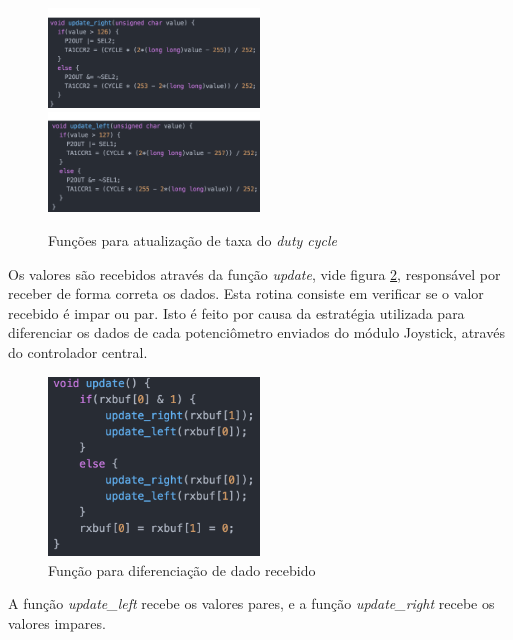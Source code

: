     \begin{figure}[!htb]
    \centering
    \includegraphics[width = 0.5\textwidth]{figuras/resultados/update_motor_right}
    \includegraphics[width = 0.5\textwidth]{figuras/resultados/update_motor_left}
    \caption{Funções para atualização de taxa do \textit{duty cycle}}
    \label{fig:update_motors}
    \end{figure}

    Os valores são recebidos através da função \textit{update}, vide figura \ref{fig:update}, responsável por receber de forma correta os dados. Esta rotina consiste em verificar se o valor recebido é impar ou par. Isto é feito por causa da estratégia utilizada para diferenciar os dados de cada potenciômetro enviados do módulo Joystick, através do controlador central.

    \begin{figure}[!htb]
    \centering
    \includegraphics[width = 0.5\textwidth]{figuras/resultados/update}
    \caption{Função para diferenciação de dado recebido}
    \label{fig:update}
    \end{figure}


    A função \textit{update\_left} recebe os valores pares, e a função \textit{update\_right} recebe os valores impares.

